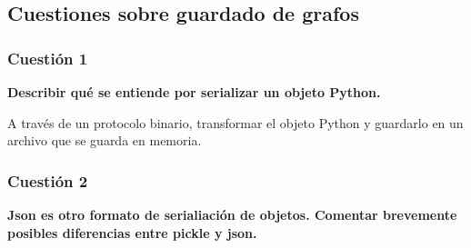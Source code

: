 \documentclass[11pt]{article}
\begin{document}
    \subsection{Cuestiones sobre guardado de
grafos}\label{cuestiones-sobre-guardado-de-grafos}

\subsubsection{Cuestión 1}\label{cuestiuxf3n-1}

\textbf{Describir qué se entiende por serializar un objeto Python.}

A través de un protocolo binario, transformar el objeto Python y
guardarlo en un archivo que se guarda en memoria.

\subsubsection{Cuestión 2}\label{cuestiuxf3n-2}

\textbf{Json es otro formato de serialiación de objetos. Comentar
brevemente posibles diferencias entre pickle y json.}
\end{document}
